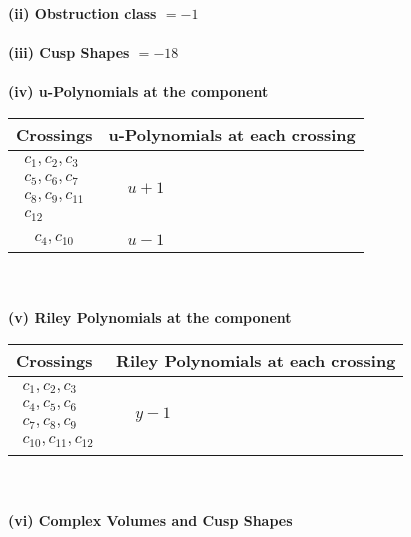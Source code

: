 \documentclass[1p]{elsarticle_modified}
\theoremstyle{definition}
\begin{document}
\flushleft \textbf{(ii) Obstruction class $= -1$}\\~\\
\flushleft \textbf{(iii) Cusp Shapes $= -18$}\\~\\
\newpage\renewcommand{\arraystretch}{1}
\flushleft \textbf{(iv) u-Polynomials at the component}\newline \\
\begin{tabular}{m{50pt}|m{274pt}}
Crossings & \hspace{64pt}u-Polynomials at each crossing \\
\hline $$\begin{aligned}c_{1},c_{2},c_{3}\\c_{5},c_{6},c_{7}\\c_{8},c_{9},c_{11}\\c_{12}\end{aligned}$$&$\begin{aligned}
&u+1
\end{aligned}$\\
\hline $$\begin{aligned}c_{4},c_{10}\end{aligned}$$&$\begin{aligned}
&u-1
\end{aligned}$\\
\hline
\end{tabular}\\~\\
\newpage\renewcommand{\arraystretch}{1}
\flushleft \textbf{(v) Riley Polynomials at the component}\newline \\
\begin{tabular}{m{50pt}|m{274pt}}
Crossings & \hspace{64pt}Riley Polynomials at each crossing \\
\hline $$\begin{aligned}c_{1},c_{2},c_{3}\\c_{4},c_{5},c_{6}\\c_{7},c_{8},c_{9}\\c_{10},c_{11},c_{12}\end{aligned}$$&$\begin{aligned}
&y-1
\end{aligned}$\\
\hline
\end{tabular}\\~\\
\newpage\flushleft \textbf{(vi) Complex Volumes and Cusp Shapes}
\end{document}
